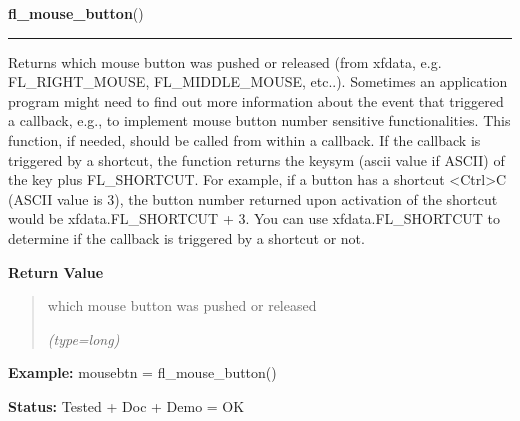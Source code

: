 \hspace{.8\funcindent}\begin{boxedminipage}{\funcwidth}

    \raggedright \textbf{fl\_mouse\_button}()

    \vspace{-1.5ex}

    \rule{\textwidth}{0.5\fboxrule}
\setlength{\parskip}{2ex}
    Returns which mouse button was pushed or released (from xfdata, e.g. 
    FL\_RIGHT\_MOUSE, FL\_MIDDLE\_MOUSE, etc..). Sometimes an application 
    program might need to find out more information about the event that 
    triggered a callback, e.g., to implement mouse button number sensitive 
    functionalities. This function, if needed, should be called from within
    a callback. If the callback is triggered by a shortcut, the function 
    returns the keysym (ascii value if ASCII) of the key plus FL\_SHORTCUT.
    For example, if a button has a shortcut {\textless}Ctrl{\textgreater}C 
    (ASCII value is 3), the button number returned upon activation of the 
    shortcut would be xfdata.FL\_SHORTCUT + 3. You can use 
    xfdata.FL\_SHORTCUT to determine if the callback is triggered by a 
    shortcut or not.

\setlength{\parskip}{1ex}
      \textbf{Return Value}
    \vspace{-1ex}

      \begin{quote}
      which mouse button was pushed or released

      {\it (type=long)}

      \end{quote}

\textbf{Example:} mousebtn = fl\_mouse\_button()



\textbf{Status:} Tested + Doc + Demo = OK



    \end{boxedminipage}

    \label{xformslib:flbasic:fl_mouse_button}

    \vspace{0.5ex}

